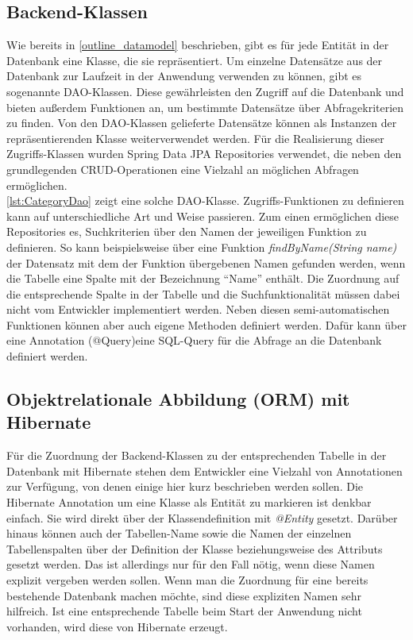 \subsection{Backend-Klassen}
Wie bereits in \cref{outline_datamodel} beschrieben, gibt es für jede Entität in der Datenbank eine Klasse, die sie repräsentiert.
Um einzelne Datensätze aus der Datenbank zur Laufzeit in der Anwendung verwenden zu können, gibt es sogenannte \acs{DAO}-Klassen.
Diese gewährleisten den Zugriff auf die Datenbank und bieten außerdem Funktionen an, um bestimmte Datensätze über Abfragekriterien zu finden.
Von den \acs{DAO}-Klassen gelieferte Datensätze können als Instanzen der repräsentierenden Klasse weiterverwendet werden.
Für die Realisierung dieser Zugriffs-Klassen wurden Spring Data \acs{JPA} Repositories verwendet, die neben den grundlegenden \acs{CRUD}-Operationen eine Vielzahl an möglichen Abfragen ermöglichen.
\\


\cref{lst:CategoryDao} zeigt eine solche \acs{DAO}-Klasse.
Zugriffs-Funktionen zu definieren kann auf unterschiedliche Art und Weise passieren. Zum einen ermöglichen diese Repositories es, Suchkriterien über den Namen der jeweiligen Funktion zu definieren.
So kann beispielsweise über eine Funktion \textit{findByName(String name)} der Datensatz mit dem der Funktion übergebenen Namen gefunden werden, wenn die Tabelle eine Spalte mit der Bezeichnung \enquote{Name} enthält. Die Zuordnung auf die entsprechende Spalte in der Tabelle und die Suchfunktionalität müssen dabei nicht vom Entwickler implementiert werden.
Neben diesen semi-automatischen Funktionen können aber auch eigene Methoden definiert werden. Dafür kann über eine Annotation (@Query)eine \acs{SQL}-Query für die Abfrage an die Datenbank definiert werden.

\subsection{Objektrelationale Abbildung (\acs{ORM}) mit Hibernate}
Für die Zuordnung der Backend-Klassen zu der entsprechenden Tabelle in der Datenbank mit Hibernate stehen dem Entwickler eine Vielzahl von Annotationen zur Verfügung, von denen einige hier kurz beschrieben werden sollen.
Die Hibernate Annotation um eine Klasse als Entität zu markieren ist denkbar einfach. Sie wird direkt über der Klassendefinition mit \textit{@Entity} gesetzt.
Darüber hinaus können auch der Tabellen-Name sowie die Namen der einzelnen Tabellenspalten über der Definition der Klasse beziehungsweise des Attributs gesetzt werden. Das ist allerdings nur für den Fall nötig, wenn diese Namen explizit vergeben werden sollen.
Wenn man die Zuordnung für eine bereits bestehende Datenbank machen möchte, sind diese expliziten Namen sehr hilfreich.
Ist eine entsprechende Tabelle beim Start der Anwendung nicht vorhanden, wird diese von Hibernate erzeugt.

